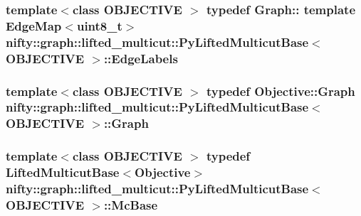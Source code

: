 \subsubsection[{Edge\+Labels}]{\setlength{\rightskip}{0pt plus 5cm}template$<$class O\+B\+J\+E\+C\+T\+I\+V\+E $>$ typedef Graph\+:: template Edge\+Map$<$uint8\+\_\+t$>$ {\bf nifty\+::graph\+::lifted\+\_\+multicut\+::\+Py\+Lifted\+Multicut\+Base}$<$ O\+B\+J\+E\+C\+T\+I\+V\+E $>$\+::{\bf Edge\+Labels}}\label{classnifty_1_1graph_1_1lifted__multicut_1_1PyLiftedMulticutBase_a315b2b14771d976533cedb73a8e8004a}
\hypertarget{classnifty_1_1graph_1_1lifted__multicut_1_1PyLiftedMulticutBase_aea9f8f1722ad75065d2638d88a5d5d61}{}
\subsubsection[{Graph}]{\setlength{\rightskip}{0pt plus 5cm}template$<$class O\+B\+J\+E\+C\+T\+I\+V\+E $>$ typedef Objective\+::\+Graph {\bf nifty\+::graph\+::lifted\+\_\+multicut\+::\+Py\+Lifted\+Multicut\+Base}$<$ O\+B\+J\+E\+C\+T\+I\+V\+E $>$\+::{\bf Graph}}\label{classnifty_1_1graph_1_1lifted__multicut_1_1PyLiftedMulticutBase_aea9f8f1722ad75065d2638d88a5d5d61}
\hypertarget{classnifty_1_1graph_1_1lifted__multicut_1_1PyLiftedMulticutBase_ab9586d4f71682a2af32ef9f3283ce311}{}
\subsubsection[{Mc\+Base}]{\setlength{\rightskip}{0pt plus 5cm}template$<$class O\+B\+J\+E\+C\+T\+I\+V\+E $>$ typedef {\bf Lifted\+Multicut\+Base}$<${\bf Objective}$>$ {\bf nifty\+::graph\+::lifted\+\_\+multicut\+::\+Py\+Lifted\+Multicut\+Base}$<$ O\+B\+J\+E\+C\+T\+I\+V\+E $>$\+::{\bf Mc\+Base}}\label{classnifty_1_1graph_1_1lifted__multicut_1_1PyLiftedMulticutBase_ab9586d4f71682a2af32ef9f3283ce311}
\hypertarget{classnifty_1_1graph_1_1lifted__multicut_1_1PyLiftedMulticutBase_ad79cf52f6bcbd7cfd9c8675d976b8a85}{}
